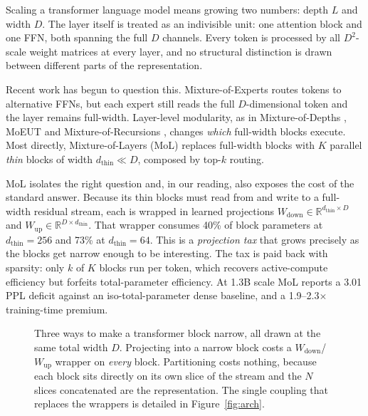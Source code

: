 \documentclass{article}
\newcommand{\dmodel}{D}
\newcommand{\nsub}{N}
\begin{document}
Scaling a transformer language model means growing two numbers: depth $L$ and
width $\dmodel$. The layer itself is treated as an indivisible unit: one
attention block and one FFN, both spanning the full $\dmodel$ channels. Every token
is processed by all $\dmodel^2$-scale weight matrices at every layer, and no
structural distinction is drawn between different parts of the representation.

Recent work has begun to question this. Mixture-of-Experts
\citep{shazeer2017moe,fedus2022switch} routes tokens to alternative FFNs, but each
expert still reads the full $\dmodel$-dimensional token and the layer remains
full-width. Layer-level modularity, as in Mixture-of-Depths
\citep{raposo2024mod}, MoEUT \citep{csordas2024moeut} and Mixture-of-Recursions
\citep{bae2025mor}, changes \emph{which} full-width blocks execute. Most directly, Mixture-of-Layers
(MoL) \citep{ternovtsii2026mol} replaces full-width blocks with $K$ parallel
\emph{thin} blocks of width $d_{\text{thin}} \!\ll\! \dmodel$, composed by top-$k$
routing.

MoL isolates the right question and, in our reading, also exposes the cost of the
standard answer. Because its thin blocks must read from and write to a
full-width residual stream, each is wrapped in learned projections
$W_{\text{down}} \in \mathbb{R}^{d_{\text{thin}} \times \dmodel}$ and
$W_{\text{up}} \in \mathbb{R}^{\dmodel \times d_{\text{thin}}}$. That wrapper
consumes 40\% of block parameters at $d_{\text{thin}}{=}256$ and 73\% at
$d_{\text{thin}}{=}64$. This is a \emph{projection tax} that grows precisely as
the blocks get narrow enough to be interesting. The tax is paid back with sparsity:
only $k$ of $K$ blocks run per token, which recovers active-compute efficiency but
forfeits total-parameter efficiency. At 1.3B scale MoL reports a 3.01 PPL deficit
against an iso-total-parameter dense baseline, and a 1.9--2.3$\times$ training-time
premium.

\begin{figure}[t]
\begin{center}
\resizebox{\textwidth}{!}{}
\end{center}
\caption{Three ways to make a transformer block narrow, all drawn at the same
total width $\dmodel$. Projecting into a narrow block costs a
$W_{\mathrm{down}}$/$W_{\mathrm{up}}$ wrapper on \emph{every} block. Partitioning
costs nothing, because each block sits directly on its own slice of the stream
and the $\nsub$ slices concatenated are the representation. The single coupling
that replaces the wrappers is detailed in Figure~\ref{fig:arch}.}
\label{fig:threeways}
\end{figure}
\end{document}
